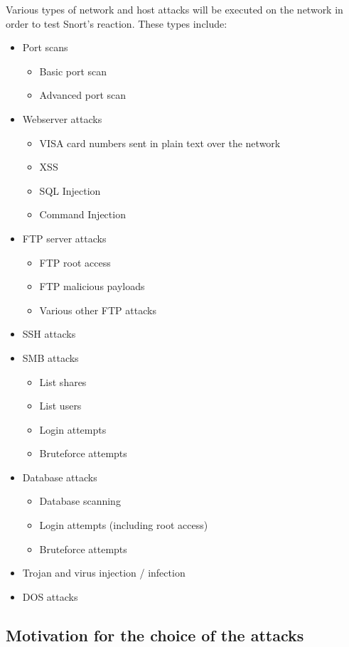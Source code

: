 Various types of network and host attacks will be executed on the network in order to test Snort's reaction. These types include:
\begin{itemize}
\item Port scans
	\begin{itemize}
	\item Basic port scan
	\item Advanced port scan
	\end{itemize}
\item Webserver attacks
	\begin{itemize}
	\item VISA card numbers sent in plain text over the network
	\item XSS
	\item SQL Injection
	\item Command Injection
	\end{itemize}
\item FTP server attacks
	\begin{itemize}
	\item FTP root access
	\item FTP malicious payloads
	\item Various other FTP attacks
	\end{itemize}
\item SSH attacks
\item SMB attacks
	\begin{itemize}
	\item List shares
	\item List users
	\item Login attempts
	\item Bruteforce attempts
	\end{itemize}
\item Database attacks
	\begin{itemize}
	\item Database scanning
	\item Login attempts (including root access)
	\item Bruteforce attempts
	\end{itemize}
\item Trojan and virus injection / infection
\item DOS attacks
\end{itemize}

\subsection{Motivation for the choice of the attacks}

